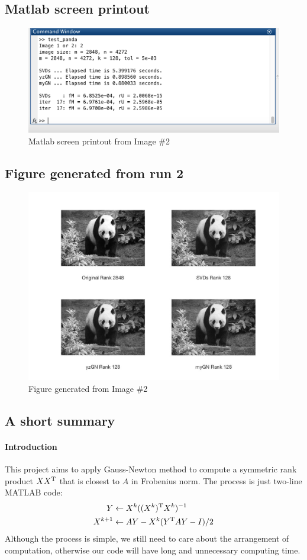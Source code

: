\subsection*{Matlab screen printout}
\begin{figure}[H]
\centering
\includegraphics[width=16cm]{f_1.png}
\caption{Matlab screen printout from Image $\#$2}
\end{figure}
\clearpage
\subsection*{Figure generated from run 2}
\begin{figure}[H]
\centering
\includegraphics[width=16cm]{f_2}
\caption{Figure generated from Image $\#$2}
\end{figure}
\clearpage
\subsection*{A short summary}
\paragraph{Introduction}
This project aims to apply Gauss-Newton method to compute a symmetric rank product $XX^{\mathrm T}$ that is closest to $A$ in Frobenius norm. The process is just two-line MATLAB code:
\begin{align*}
Y&\leftarrow X^k((X^k)^{\mathrm T} X^k)^{-1}\\
X^{k+1}&\leftarrow AY - X^k(Y^{\mathrm T} AY - I)/2
\end{align*}
Although the process is simple, we still need to care about the arrangement of computation, otherwise our code will have long and unnecessary computing time.
